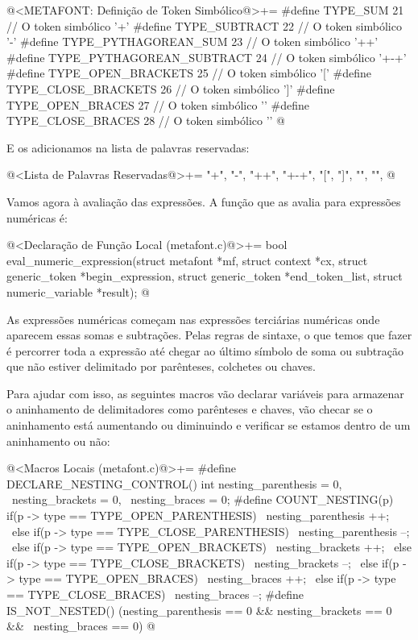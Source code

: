 \iniciocodigo
@<METAFONT: Definição de Token Simbólico@>+=
#define TYPE_SUM                   21 // O token simbólico '+'
#define TYPE_SUBTRACT              22 // O token simbólico '-'
#define TYPE_PYTHAGOREAN_SUM       23 // O token simbólico '++'
#define TYPE_PYTHAGOREAN_SUBTRACT  24 // O token simbólico '+-+'
#define TYPE_OPEN_BRACKETS         25 // O token simbólico '['
#define TYPE_CLOSE_BRACKETS        26 // O token simbólico ']'
#define TYPE_OPEN_BRACES           27 // O token simbólico '{'
#define TYPE_CLOSE_BRACES          28 // O token simbólico '}'
@
\fimcodigo

E os adicionamos na lista de palavras reservadas:

\iniciocodigo
@<Lista de Palavras Reservadas@>+=
"+", "-", "++", "+-+", "[", "]", "{", "}",
@
\fimcodigo


Vamos agora à avaliação das expressões. A função que as avalia para
expressões numéricas é:

\iniciocodigo
@<Declaração de Função Local (metafont.c)@>+=
bool eval_numeric_expression(struct metafont *mf, struct context *cx,
                             struct generic_token *begin_expression,
                             struct generic_token *end_token_list,
                             struct numeric_variable *result);
@
\fimcodigo


As expressões numéricas começam nas expressões terciárias numéricas
onde aparecem essas somas e subtrações. Pelas regras de sintaxe, o que
temos que fazer é percorrer toda a expressão até chegar ao último
símbolo de soma ou subtração que não estiver delimitado por
parênteses, colchetes ou chaves.

Para ajudar com isso, as seguintes macros vão declarar variáveis para
armazenar o aninhamento de delimitadores como parênteses e chaves, vão
checar se o aninhamento está aumentando ou diminuindo e verificar se
estamos dentro de um aninhamento ou não:

\iniciocodigo
@<Macros Locais (metafont.c)@>+=
#define DECLARE_NESTING_CONTROL() int nesting_parenthesis = 0, \
                                      nesting_brackets = 0, \
                                      nesting_braces = 0;
#define COUNT_NESTING(p) if(p -> type == TYPE_OPEN_PARENTHESIS)           \
                               nesting_parenthesis ++;                    \
                             else if(p -> type == TYPE_CLOSE_PARENTHESIS) \
                               nesting_parenthesis --;                    \
                             else if(p -> type == TYPE_OPEN_BRACKETS)     \
                               nesting_brackets ++;                       \
                             else if(p -> type == TYPE_CLOSE_BRACKETS)    \
                               nesting_brackets --;                       \
                             else if(p -> type == TYPE_OPEN_BRACES)       \
                               nesting_braces ++;                         \
                             else if(p -> type == TYPE_CLOSE_BRACES)      \
                               nesting_braces --;
#define IS_NOT_NESTED() (nesting_parenthesis == 0 && nesting_brackets == 0 && \
                         nesting_braces == 0)
@
\fimcodigo


